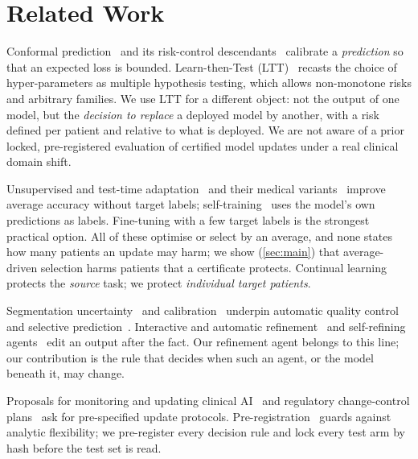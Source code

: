 \section{Related Work}
\label{sec:related}

Conformal prediction~\cite{vovk2005alrw,angelopoulos2021gentle} and its risk-control descendants~\cite{bates2021rcps,angelopoulos2024crc,angelopoulos2022image2image} calibrate a \emph{prediction} so that an expected loss is bounded.
Learn-then-Test (LTT)~\cite{angelopoulos2021ltt} recasts the choice of hyper-parameters as multiple hypothesis testing, which allows non-monotone risks and arbitrary families.
We use LTT for a different object: not the output of one model, but the \emph{decision to replace} a deployed model by another, with a risk defined per patient and relative to what is deployed.
We are not aware of a prior locked, pre-registered evaluation of certified model updates under a real clinical domain shift.

Unsupervised and test-time adaptation~\cite{ganin2016dann,sun2020ttt,wang2021tent} and their medical variants~\cite{karani2021tta} improve average accuracy without target labels; self-training~\cite{lee2013pseudo,xie2020noisy} uses the model's own predictions as labels.
Fine-tuning with a few target labels is the strongest practical option.
All of these optimise or select by an average, and none states how many patients an update may harm; we show (\cref{sec:main}) that average-driven selection harms patients that a certificate protects.
Continual learning~\cite{kirkpatrick2017ewc} protects the \emph{source} task; we protect \emph{individual target patients}.

Segmentation uncertainty~\cite{kendall2017uncertainties,lakshminarayanan2017ensembles,jungo2019reliability} and calibration~\cite{guo2017calibration,mehrtash2020calibration} underpin automatic quality control~\cite{kohlberger2012evaluating,robinson2019automated} and selective prediction~\cite{geifman2017selective}.
Interactive and automatic refinement~\cite{wang2019deepigeos} and self-refining agents~\cite{madaan2023selfrefine,shinn2023reflexion} edit an output after the fact.
Our refinement agent belongs to this line; our contribution is the rule that decides when such an agent, or the model beneath it, may change.

Proposals for monitoring and updating clinical AI~\cite{feng2022monitoring} and regulatory change-control plans~\cite{fda2023pccp} ask for pre-specified update protocols.
Pre-registration~\cite{nosek2018preregistration} guards against analytic flexibility; we pre-register every decision rule and lock every test arm by hash before the test set is read.
